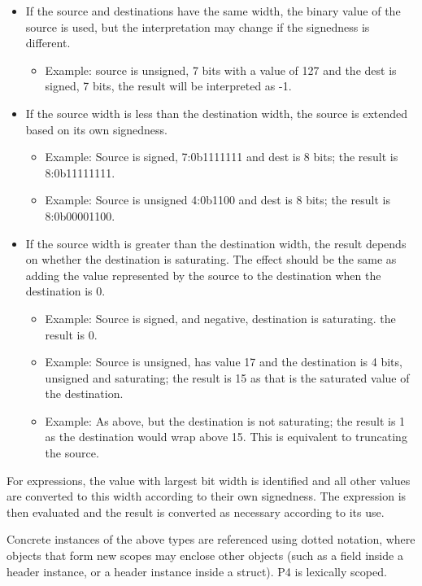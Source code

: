 \documentclass[12pt]{article}
\begin{document}
\begin{itemize}
\item
If the source and destinations have the same width, the binary value
of the source is used, but the interpretation may change if the
signedness is different.
\begin{itemize}
\item
Example: source is unsigned, 7 bits with a value of 127 and the dest
is signed, 7 bits, the result will be interpreted as -1.
\end{itemize}
\item
If the source width is less than the destination width, the source is
extended based on its own signedness.
\begin{itemize}
\item
Example: Source is signed, 7:0b1111111 and dest is 8 bits; the result is 
8:0b11111111.
\item
Example: Source is unsigned 4:0b1100 and dest is 8 bits; the result is
8:0b00001100.
\end{itemize}
\item
If the source width is greater than the destination width, the result
depends on whether the destination is saturating.  The effect should
be the same as adding the value represented by the source to the
destination when the destination is 0.
\begin{itemize}
\item
Example: Source is signed, and negative, destination is
saturating. the result is 0.
\item
Example: Source is unsigned, has value 17 and the destination is 4
bits, unsigned and saturating; the result is 15 as that is the
saturated value of the destination.
\item
Example: As above, but the destination is not saturating; the result is 1 
as the destination would wrap above 15. This is equivalent to truncating the 
source.
\end{itemize}
\end{itemize}

For expressions, the value with largest bit width is identified and
all other values are converted to this width according to their own
signedness.  The expression is then evaluated and the result is
converted as necessary according to its use.


Concrete instances of the above types are referenced using dotted notation,
where objects that form new scopes may enclose other objects (such as a field
inside a header instance, or a header instance inside a struct). P4 is
lexically scoped.
\end{document}

